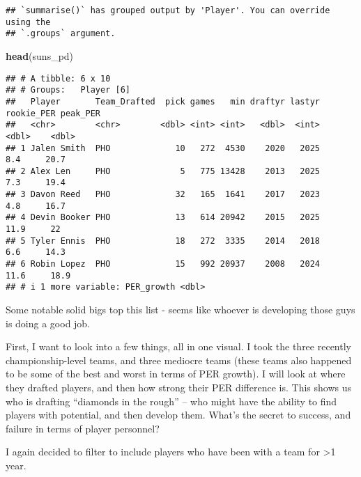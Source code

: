 \documentclass[
]{article}
\newenvironment{Shaded}{\begin{snugshade}}{\end{snugshade}}
\newcommand{\FunctionTok}[1]{\textcolor[rgb]{0.13,0.29,0.53}{\textbf{#1}}}
\newcommand{\NormalTok}[1]{#1}
\begin{document}
\begin{verbatim}
## `summarise()` has grouped output by 'Player'. You can override using the
## `.groups` argument.
\end{verbatim}

\begin{Shaded}
\begin{Highlighting}[]
\FunctionTok{head}\NormalTok{(suns\_pd)}
\end{Highlighting}
\end{Shaded}

\begin{verbatim}
## # A tibble: 6 x 10
## # Groups:   Player [6]
##   Player       Team_Drafted  pick games   min draftyr lastyr rookie_PER peak_PER
##   <chr>        <chr>        <dbl> <int> <int>   <dbl>  <int>      <dbl>    <dbl>
## 1 Jalen Smith  PHO             10   272  4530    2020   2025        8.4     20.7
## 2 Alex Len     PHO              5   775 13428    2013   2025        7.3     19.4
## 3 Davon Reed   PHO             32   165  1641    2017   2023        4.8     16.7
## 4 Devin Booker PHO             13   614 20942    2015   2025       11.9     22  
## 5 Tyler Ennis  PHO             18   272  3335    2014   2018        6.6     14.3
## 6 Robin Lopez  PHO             15   992 20937    2008   2024       11.6     18.9
## # i 1 more variable: PER_growth <dbl>
\end{verbatim}

Some notable solid bigs top this list - seems like whoever is developing
those guys is doing a good job.

First, I want to look into a few things, all in one visual. I took the
three recently championship-level teams, and three mediocre teams (these
teams also happened to be some of the best and worst in terms of PER
growth). I will look at where they drafted players, and then how strong
their PER difference is. This shows us who is drafting ``diamonds in the
rough'' -- who might have the ability to find players with potential,
and then develop them. What's the secret to success, and failure in
terms of player personnel?

I again decided to filter to include players who have been with a team
for \textgreater1 year.
\end{document}
